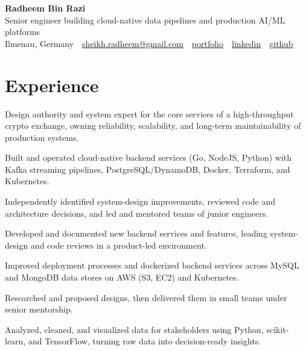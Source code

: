\documentclass[11pt,a4paper]{resume}
\makeatletter
\newcommand{\Portfolio}{https://radheem.github.io/my-cv}
\newcommand{\PortfolioText}{portfolio}
\newcommand{\GitHub}{https://github.com/radheem}
\newcommand{\LinkedIn}{https://www.linkedin.com/in/radheem-razi}
\newcommand{\Email}{sheikh.radheem@gmail.com}
\makeatother
\begin{document}
\begin{center}
  {\huge\bfseries Radheem Bin Razi}\\[3pt]
  {\large Senior engineer building cloud-native data pipelines and production AI/ML platforms}\\[6pt]
  \small
  Ilmenau, Germany \,\textbar\,
  \href{mailto:\Email}{\Email} \,\textbar\,
  \href{\Portfolio}{\PortfolioText} \,\textbar\,
  \href{\LinkedIn}{linkedin} \,\textbar\,
  \href{\GitHub}{github}
\end{center}
\vspace{2pt}

\section{Experience}

\bullets
  \item Design authority and system expert for the core services of a high-throughput crypto exchange, owning reliability, scalability, and long-term maintainability of production systems.
  \item Built and operated cloud-native backend services (Go, NodeJS, Python) with Kafka streaming pipelines, PostgreSQL/DynamoDB, Docker, Terraform, and Kubernetes.
  \item Independently identified system-design improvements, reviewed code and architecture decisions, and led and mentored teams of junior engineers.
\bulletsend
\vspace{3pt}
\bullets
  \item Developed and documented new backend services and features, leading system-design and code reviews in a product-led environment.
  \item Improved deployment processes and dockerized backend services across MySQL and MongoDB data stores on AWS (S3, EC2) and Kubernetes.
\bulletsend
\vspace{3pt}
\bullets
  \item Researched and proposed designs, then delivered them in small teams under senior mentorship.
  \item Analyzed, cleaned, and visualized data for stakeholders using Python, scikit-learn, and TensorFlow, turning raw data into decision-ready insights.
\bulletsend
\vspace{3pt}
\end{document}
